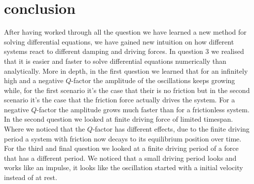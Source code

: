 \section{conclusion}
After having worked through all the question we have learned a new method for solving differential equations, we have gained new intuition on how different systems react to different damping and driving forces. In question 3 we realised that it is easier and faster to solve differential equations numerically than analytically.
More in depth, in the first question we learned that for an infinitely high and a negative $Q$-factor the amplitude of the oscillations keeps growing while, for the first scenario it's the case that their is no friction but in the second scenario it's the case that the friction force actually drives the system. For a negative $Q$-factor the amplitude grows much faster than for a frictionless system.
In the second question we looked at finite driving force of limited timespan. Where we noticed that the $Q$-factor has different effects, due to the finite driving period a system with friction now decays to its equilibrium position over time.
For the third and final question we looked at a finite driving period of a force that has a different period. We noticed that a small driving period looks and works like an impulse, it looks like the oscillation started with a initial velocity instead of at rest.